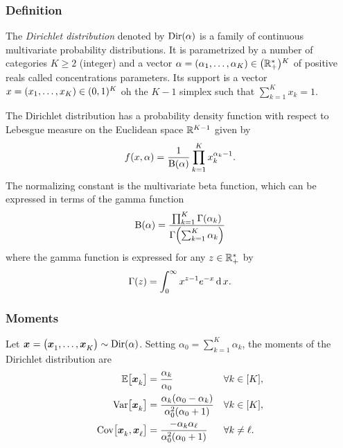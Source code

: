 \subsubsection{Definition}


The \emph{Dirichlet distribution} denoted by $\operatorname{Dir}(\alpha)$ is a family of continuous multivariate probability distributions.
It is parametrized by a number of categories $K \ge 2$ (integer) and a vector $\alpha=\bracket{\alpha_1,\ldots,\alpha_K}\in\bracket{\RR_+^*}^K$ of positive reals called concentrations parameters.
Its support is a vector $x=\bracket{x_1,\ldots,x_K}\in\bracket{0,1}^K$ oh the $K-1$ simplex \ie such that $\sum_{k=1}^K x_k = 1$.

The Dirichlet distribution has a probability density function with respect to Lebesgue measure on the Euclidean space $\mathbb{R}^{K-1}$ given by
\begin{equation}\label{eq:dirchlet:probability-density-function}
  f\bracket{x,\alpha} = \frac{1}{ \Beta\bracket{\alpha}}\prod_{k=1}^K x_k^{\alpha_k-1}.
\end{equation}
The normalizing constant is the multivariate beta function, which can be expressed in terms of the gamma function
\begin{equation}
  \Beta\bracket{\alpha} =
  \frac{ \prod_{k=1}^K \Gamma\bracket{\alpha_k} }
       { \Gamma\bracket{\sum_{k=1}^K \alpha_k} }
\end{equation}
where the gamma function is expressed for any $z\in\mathbb{R}_+^*$ by
\begin{equation}
  \Gamma\bracket{z} = \int_0^{\infty} x^{z-1}e^{-x} \diff x.
\end{equation}


\subsubsection{Moments}


Let $\va x=\bracket{\va x_1,\ldots,\va x_K}\sim \Dir\bracket{\alpha}$.
Setting $\alpha_0=\sum_{k=1}^K\alpha_k$, the moments of the Dirichlet distribution are
\begin{subequations}\label{eq:dirchlet:moments}
  \begin{align}
    \espe\sqbracket{\va x_k} &= \frac{\alpha_k}{\alpha_0} && \forall k\in\range{K},
    \label{eq:dirchlet:moments:mean}
    \\
    \vari\sqbracket{\va x_k} &= \frac{\alpha_k\bracket{\alpha_0-\alpha_k}}{\alpha_0^2\bracket{\alpha_0+1}} && \forall k\in\range{K},
    \label{eq:dirchlet:moments:variance}
    \\
    \cova\sqbracket{\va x_k,\va x_{\ell}} &= \frac{-\alpha_k\alpha_{\ell}}{\alpha_0^2\bracket{\alpha_0+1}} && \forall k\ne\ell.
    \label{eq:dirchlet:moments:covariance}
  \end{align}
\end{subequations}


